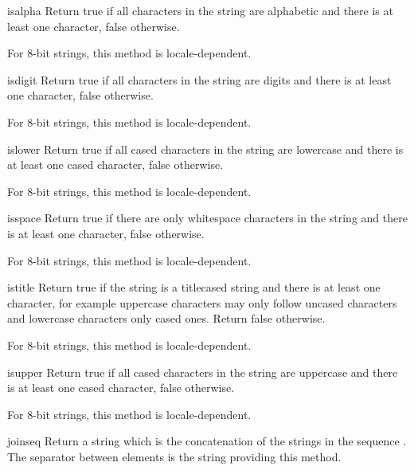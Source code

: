 \begin{methoddesc}[string]{isalpha}{}
Return true if all characters in the string are alphabetic and there
is at least one character, false otherwise.

For 8-bit strings, this method is locale-dependent.
\end{methoddesc}

\begin{methoddesc}[string]{isdigit}{}
Return true if all characters in the string are digits and there
is at least one character, false otherwise.

For 8-bit strings, this method is locale-dependent.
\end{methoddesc}

\begin{methoddesc}[string]{islower}{}
Return true if all cased characters in the string are lowercase and
there is at least one cased character, false otherwise.

For 8-bit strings, this method is locale-dependent.
\end{methoddesc}

\begin{methoddesc}[string]{isspace}{}
Return true if there are only whitespace characters in the string and
there is at least one character, false otherwise.

For 8-bit strings, this method is locale-dependent.
\end{methoddesc}

\begin{methoddesc}[string]{istitle}{}
Return true if the string is a titlecased string and there is at least one
character, for example uppercase characters may only follow uncased
characters and lowercase characters only cased ones.  Return false
otherwise.

For 8-bit strings, this method is locale-dependent.
\end{methoddesc}

\begin{methoddesc}[string]{isupper}{}
Return true if all cased characters in the string are uppercase and
there is at least one cased character, false otherwise.

For 8-bit strings, this method is locale-dependent.
\end{methoddesc}

\begin{methoddesc}[string]{join}{seq}
Return a string which is the concatenation of the strings in the
sequence .  The separator between elements is the string
providing this method.
\end{methoddesc}

